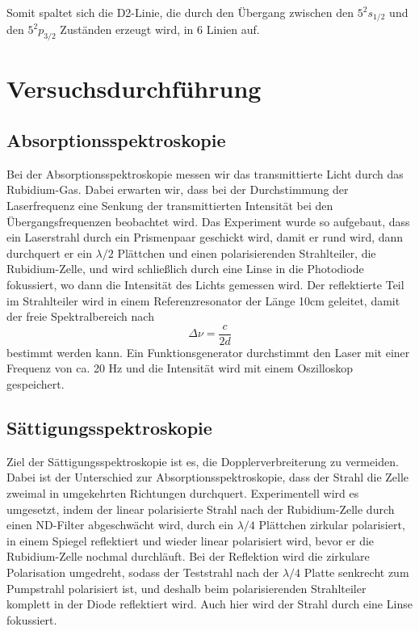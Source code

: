 \documentclass[a4paper,parskip]{scrartcl}
\begin{document}
Somit spaltet sich die D2-Linie, die durch den Übergang zwischen den $5^2s_{1/2}$ und den $5^2p_{3/2}$ Zuständen erzeugt wird, in 6 Linien auf.

\section{Versuchsdurchführung}

\subsection{Absorptionsspektroskopie}

 Bei der Absorptionsspektroskopie messen wir das transmittierte Licht durch das Rubidium-Gas. Dabei erwarten wir, dass bei der Durchstimmung der Laserfrequenz eine Senkung der transmittierten Intensität bei den Übergangsfrequenzen beobachtet wird. Das Experiment wurde so aufgebaut, dass ein Laserstrahl durch ein Prismenpaar geschickt wird, damit er rund wird, dann durchquert er ein $\lambda /2$ Plättchen und einen polarisierenden Strahlteiler, die Rubidium-Zelle, und wird schließlich durch eine Linse in die Photodiode fokussiert, wo dann die Intensität des Lichts gemessen wird. Der reflektierte Teil im Strahlteiler wird in einem Referenzresonator der Länge 10cm geleitet, damit der freie Spektralbereich nach 
\begin{equation*}
	\Delta \nu = \frac{c}{2d}
\end{equation*}
bestimmt werden kann.
Ein Funktionsgenerator durchstimmt den Laser mit einer Frequenz von ca. 20 Hz und die Intensität wird mit einem Oszilloskop gespeichert.

\subsection{Sättigungsspektroskopie}

Ziel der Sättigungsspektroskopie ist es, die Dopplerverbreiterung zu vermeiden. Dabei ist der Unterschied zur Absorptionsspektroskopie, dass der Strahl die Zelle zweimal in umgekehrten Richtungen durchquert. Experimentell wird es umgesetzt, indem der linear polarisierte Strahl nach der Rubidium-Zelle durch einen ND-Filter abgeschwächt wird, durch ein $\lambda/4$ Plättchen zirkular polarisiert, in einem Spiegel reflektiert und wieder linear polarisiert wird, bevor er die Rubidium-Zelle nochmal durchläuft. Bei der Reflektion wird die zirkulare Polarisation umgedreht, sodass der Teststrahl nach der $\lambda/4$ Platte senkrecht zum Pumpstrahl polarisiert ist, und deshalb beim polarisierenden Strahlteiler komplett in der Diode reflektiert wird. Auch hier wird der Strahl durch eine Linse fokussiert.
\end{document}
